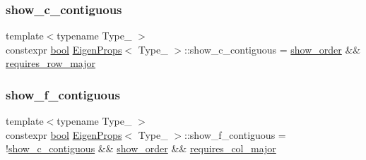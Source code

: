 \mbox{\label{struct_eigen_props_a280202108f280aab1ccbe5f9e946a8eb}} 
\subsubsection{\texorpdfstring{show\_c\_contiguous}{show\_c\_contiguous}}
{\footnotesize\ttfamily template$<$typename Type\+\_\+ $>$ \\
constexpr \mbox{\hyperlink{asdl_8h_af6a258d8f3ee5206d682d799316314b1}{bool}} \mbox{\hyperlink{struct_eigen_props}{Eigen\+Props}}$<$ Type\+\_\+ $>$\+::show\+\_\+c\+\_\+contiguous = \mbox{\hyperlink{struct_eigen_props_ae3040a55462cdeaed7843ba858eb8e68}{show\+\_\+order}} \&\& \mbox{\hyperlink{struct_eigen_props_a71445c69c5e4084c30449ff2207571c7}{requires\+\_\+row\+\_\+major}}\hspace{0.3cm}{\ttfamily [static]}}

\mbox{\label{struct_eigen_props_ae9fd27ba9318cfb3d632f80bfc04e94f}} 
\subsubsection{\texorpdfstring{show\_f\_contiguous}{show\_f\_contiguous}}
{\footnotesize\ttfamily template$<$typename Type\+\_\+ $>$ \\
constexpr \mbox{\hyperlink{asdl_8h_af6a258d8f3ee5206d682d799316314b1}{bool}} \mbox{\hyperlink{struct_eigen_props}{Eigen\+Props}}$<$ Type\+\_\+ $>$\+::show\+\_\+f\+\_\+contiguous = !\mbox{\hyperlink{struct_eigen_props_a280202108f280aab1ccbe5f9e946a8eb}{show\+\_\+c\+\_\+contiguous}} \&\& \mbox{\hyperlink{struct_eigen_props_ae3040a55462cdeaed7843ba858eb8e68}{show\+\_\+order}} \&\& \mbox{\hyperlink{struct_eigen_props_a070c53f0e952e411c98e3ddfdbeaae3d}{requires\+\_\+col\+\_\+major}}\hspace{0.3cm}{\ttfamily [static]}}

\mbox{\label{struct_eigen_props_ae3040a55462cdeaed7843ba858eb8e68}} 
